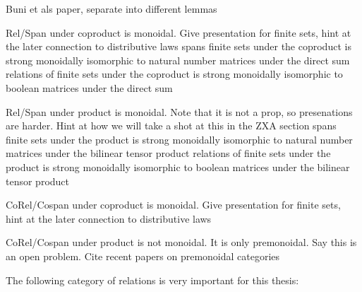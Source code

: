 \begin{lemma} %
Buni et als paper, separate into different lemmas


Rel/Span under coproduct is monoidal.  Give presentation for finite sets, hint at the later connection to distributive laws
  spans finite sets under the coproduct is strong monoidally isomorphic to natural number matrices under the direct sum
  relations of finite sets under the coproduct is strong monoidally isomorphic to boolean matrices under the direct sum

Rel/Span under product is monoidal.  Note that it is not a prop, so presenations are harder.  Hint at how we will take a shot at this in the ZXA section
  spans finite sets under the product is strong monoidally isomorphic to natural number matrices under the bilinear tensor product
  relations of finite sets under the product is strong monoidally isomorphic to boolean matrices under the bilinear tensor product


CoRel/Cospan under coproduct is monoidal.  Give presentation for finite sets, hint at the later connection to distributive laws



CoRel/Cospan under product is not monoidal.  It is only premonoidal.  Say this is an open problem.  Cite recent papers on premonoidal categories
\end{lemma}


The following category of relations is very important for this thesis:


